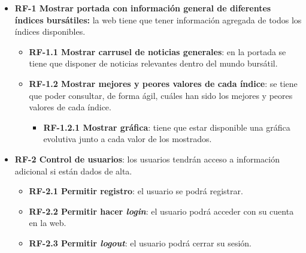 \begin{itemize}
\item 
\textbf{RF-1 Mostrar portada con información general de diferentes índices bursátiles:} la web tiene que tener información agregada de todos los índices disponibles. 
    \begin{itemize}
        \item \textbf{RF-1.1 Mostrar carrusel de noticias generales}: en la portada se 
        tiene que disponer de noticias relevantes dentro del mundo bursátil.
        \item \textbf{RF-1.2 Mostrar mejores y peores valores de cada índice}: se tiene que 
        poder consultar, de forma ágil, cuáles han sido los mejores y peores valores de 
        cada índice.
        \begin{itemize}
            \item \textbf{RF-1.2.1 Mostrar gráfica}: tiene que estar disponible una gráfica 
            evolutiva junto a cada valor de los mostrados. 
        \end{itemize}
	\end{itemize}

\item
\textbf{RF-2 Control de usuarios}: los usuarios tendrán acceso a información adicional si
están dados de alta. 
	\begin{itemize}
        \item \textbf{RF-2.1 Permitir registro}: el usuario se podrá registrar. 
        \item \textbf{RF-2.2 Permitir hacer \emph{login}}: el usuario podrá acceder con su 
        cuenta en la web.
        \item \textbf{RF-2.3 Permitir \emph{logout}}: el usuario podrá cerrar su sesión. 
	\end{itemize}


\end{itemize}
